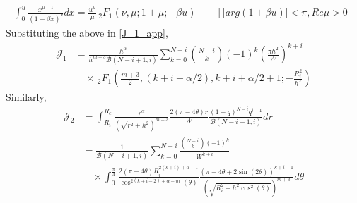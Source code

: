 \documentclass[slidestop,usepdftitle=false]{gvvslides}
\providecommand{\abs}[1]{\lvert#1\rvert}
\providecommand{\abs}[1]{\lvert#1\rvert}
\providecommand{\abs}[1]{\lvert#1\rvert}
\providecommand{\sbrak}[1]{\ensuremath{{}\left[#1\right]}}
\providecommand{\brak}[1]{\ensuremath{\left(#1\right)}}
\begin{document}
\begin{frame}
\footnotesize{
   \begin{align}
\int_{0}^{u}\frac{x^{\mu-1}}{\brak{1+\beta x}^{\nu}}dx=\frac{u^{\mu}}{\mu}  \,_2F_1\brak{\nu,\mu;1+\mu;-\beta u}
\qquad \sbrak{\abs{arg\brak{1+\beta u}} < \pi, Re\mu>0}
\end{align}
}
%
Substituting the above in \eqref{J_1_app},
 \begin{align}
    \mathcal{J}_1& = \frac{h^{\alpha}}{h^{m+3}\mathcal{B}\brak{N-i+1,i}}\sum_{k=0}^{N-i}\binom{N-i}{k}(-1)^k\brak{\frac{\pi h^2}{W}}^{k+i}
   \nonumber \\
   &\quad \times \,_2F_1\brak{\frac{m+3}{2},\brak{k+i+\alpha/2},k+i+\alpha/2+1;-\frac{R_i^2}{h^2}} 
   \end{align}
   Similarly, 
    \begin{align}
   \mathcal{J}_2 & = \int_{R_i}^{R_c}\frac{r^{\alpha}}{\brak{\sqrt{r^2+h^2}}^{m+3}}\frac{2\brak{\pi-4\theta} r}{W}\frac{\brak{1-q}^{N-i}q^{i-1}}{\mathcal{B}\brak{N-i+1,i}}dr \nonumber \\
   & = \frac{1}{\mathcal{B}\brak{N-i+1,i}}\sum_{k=0}^{N-i}\frac{\binom{N-i}{k}(-1)^k}{W^{k+i}}
  \nonumber \\
  & \quad \times   \int_{0}^{\frac{\pi}{4}} \frac{2\brak{\pi-4\theta}R_i^{2\brak{k+i}+\alpha-1}}{\cos^{2\brak{k+i-2}+\alpha-m}\brak{\theta}}
   \frac{\brak{\pi -4\theta+2\sin\brak{2\theta}}^{k+i-1}}{\brak{\sqrt{R_i^2+h^2\cos^2\brak{\theta}}}^{m+3}} d\theta
      \end{align}
\end{frame}
\end{document}
